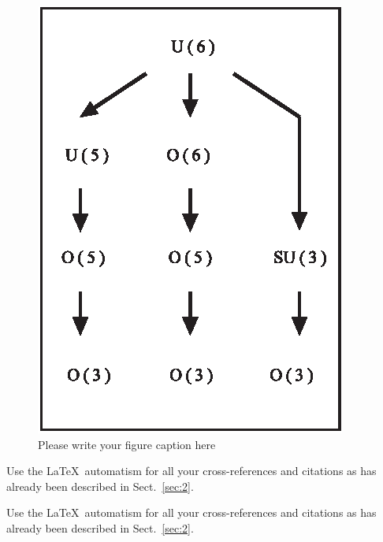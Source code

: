 \begin{figure}[t]
\sidecaption[t]
\includegraphics[scale=.65]{figure}
%
%
\caption{Please write your figure caption here}
\label{fig:2}       %
\end{figure}

 Use the \LaTeX\ automatism for all your cross-references and citations as has already been described in Sect.~\ref{sec:2}.

 Use the \LaTeX\ automatism for all your cross-refer\-ences and citations as has already been described in Sect.~\ref{sec:2}.

